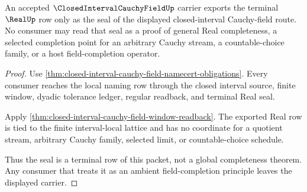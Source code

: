 \begin{theorem}\label{thm:closed-interval-cauchy-field-real-seal-nonescape}
An accepted $\ClosedIntervalCauchyFieldUp$ carrier exports the terminal $\RealUp$ row only as the seal of the displayed closed-interval Cauchy-field route. No consumer may read that seal as a proof of general Real completeness, a selected completion point for an arbitrary Cauchy stream, a countable-choice family, or a host field-completion operator.
\end{theorem}
\begin{proof}
Use \autoref{thm:closed-interval-cauchy-field-namecert-obligations}. Every consumer reaches the local naming row through the closed interval source, finite window, dyadic tolerance ledger, regular readback, and terminal Real seal.

Apply \autoref{thm:closed-interval-cauchy-field-window-readback}. The exported Real row is tied to the finite interval-local lattice and has no coordinate for a quotient stream, arbitrary Cauchy family, selected limit, or countable-choice schedule.

Thus the seal is a terminal row of this packet, not a global completeness theorem. Any consumer that treats it as an ambient field-completion principle leaves the displayed carrier.
\end{proof}


\begin{closurestatus}{\ClosedIntervalCauchyFieldUp}
  \theoryclosure{\seedClosure}
  \formalstatus{\unformalizedV}
\end{closurestatus}
